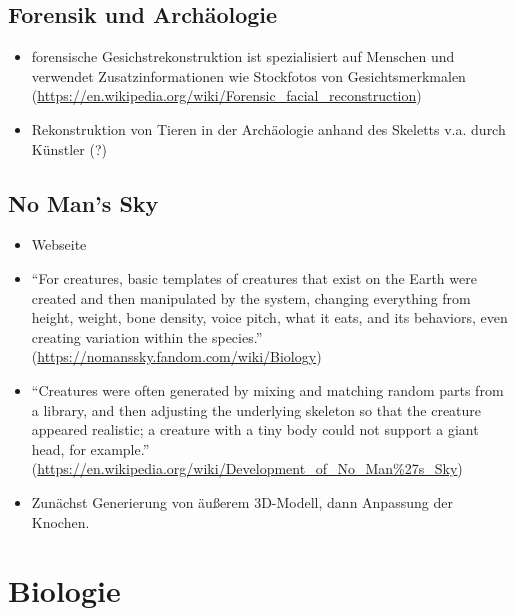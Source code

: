 \section{Forensik und Archäologie}

\begin{itemize}
 \item forensische Gesichstrekonstruktion ist spezialisiert auf Menschen und verwendet Zusatzinformationen wie Stockfotos von Gesichtsmerkmalen (\url{https://en.wikipedia.org/wiki/Forensic_facial_reconstruction})
 \item Rekonstruktion von Tieren in der Archäologie anhand des Skeletts v.a. durch Künstler (?)
\end{itemize}


\section{No Man's Sky}

\begin{itemize}
 \item Webseite \cite{NoMansSky}
 \item "`For creatures, basic templates of creatures that exist on the Earth were created and then manipulated by the system, changing everything from height, weight, bone density, voice pitch, what it eats, and its behaviors, even creating variation within the species."' (\url{https://nomanssky.fandom.com/wiki/Biology})
 \item "`Creatures were often generated by mixing and matching random parts from a library, and then adjusting the underlying skeleton so that the creature appeared realistic; a creature with a tiny body could not support a giant head, for example."' (\url{https://en.wikipedia.org/wiki/Development_of_No_Man\%27s_Sky})
 \item Zunächst Generierung von äußerem 3D-Modell, dann Anpassung der Knochen.
\end{itemize}

\chapter{Biologie}

